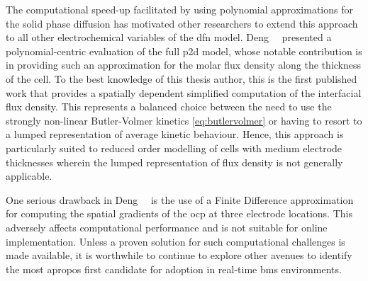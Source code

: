 

The computational  speed-up facilitated  by using polynomial  approximations for
the  solid  phase diffusion  has  motivated  other  researchers to  extend  this
approach  to  all  other  electrochemical  variables  of  the  \gls{dfn}  model.
Deng~\etal{}~\cite{Deng2018}  presented a  polynomial-centric evaluation  of the
full  \gls{p2d}  model, whose  notable  contribution  is  in providing  such  an
approximation for the molar flux density along the thickness of the cell. To the
best knowledge  of this  thesis author,  this is the  first published  work that
provides a  spatially dependent simplified  computation of the  interfacial flux
density. This represents a balanced choice  between the need to use the strongly
non-linear Butler-Volmer kinetics \cref{eq:butlervolmer} or  having to resort to
a lumped  representation of average  kinetic behaviour. Hence, this  approach is
particularly suited  to reduced order  modelling of cells with  medium electrode
thicknesses wherein the  lumped representation of flux density  is not generally
applicable.



One  serious drawback  in Deng~\etal{}~\cite{Deng2018}  is the  use of  a Finite
Difference approximation for computing the spatial gradients of the \gls{ocp} at
three electrode locations. This  adversely affects computational performance and
is not  suitable for online  implementation. Unless  a proven solution  for such
computational  challenges is  made available,  it is  worthwhile to  continue to
explore other avenues to identify the  most apropos first candidate for adoption
in real-time \gls{bms} environments.


